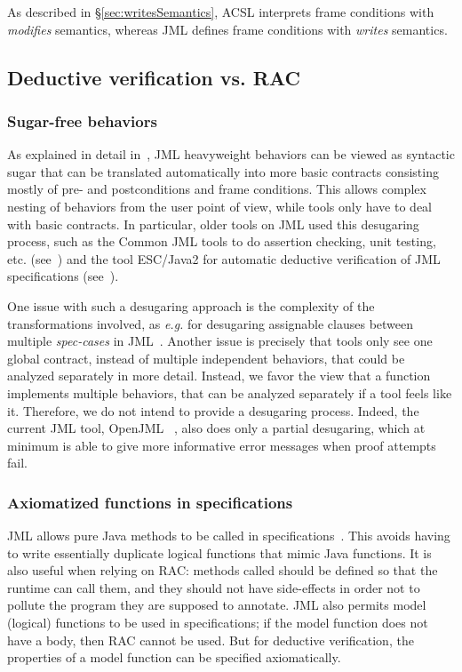 As described in \S\ref{sec:writesSemantics}, ACSL interprets frame conditions with \emph{modifies} semantics, whereas JML defines frame conditions with \emph{writes} semantics.

\subsection{Deductive verification vs. RAC}

\subsubsection*{Sugar-free behaviors}

As explained in detail in~\cite{raghavan00desugaring}, JML
heavyweight behaviors can be viewed as syntactic sugar that can be translated automatically into more basic
contracts consisting mostly of pre- and postconditions and frame
conditions.  This allows complex nesting of behaviors from the user
point of view, while tools only have to deal with basic contracts. In
particular, older tools on JML used this desugaring process, such as
the Common JML tools to do assertion checking, unit testing,
etc. (see~\cite{leavens00jml}) and the tool ESC/Java2 for
automatic deductive verification of JML specifications
(see~\cite{Kiniry-Cok05}).

One issue with such a desugaring approach is the complexity of the
transformations involved, as \emph{e.g.} for desugaring assignable clauses
between multiple \textit{spec-cases} in
JML~\cite{raghavan00desugaring}.  Another issue is precisely that
tools only see one global contract, instead of multiple independent
behaviors, that could be analyzed separately in more detail.
Instead, we favor the view that a function implements multiple
behaviors, that can be analyzed separately if a tool feels like
it. Therefore, we do not intend to provide a desugaring process.
Indeed, the current JML tool, OpenJML ~\cite{Cok-2011-OpenJML,Cok-2014-OpenJML}, also does only a partial desugaring, which at minimum is able to give more informative error messages when proof attempts fail.

\subsubsection*{Axiomatized functions in specifications}

JML allows pure Java methods to be called in
specifications~\cite{leavens00preliminary}. This avoids having
to write essentially duplicate logical functions that mimic Java functions. It is also useful when relying on RAC: methods called should be defined
so that the runtime can call them, and they should not have
side-effects in order not to pollute the program they are supposed to
annotate. 
JML also permits model (logical) functions to be
used in specifications; if the model function does not have
a body, then RAC cannot be used. But for deductive verification, 
the properties of a model function can be specified axiomatically.

